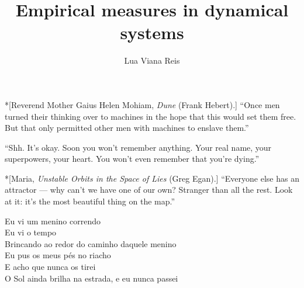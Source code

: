 \documentclass[a4paper,12pt,oneside]{memoir}
\title{Empirical measures in dynamical systems}
\author{Lua Viana Reis}
\begin{document}
\begin{titlingpage}
  \maketitle
\end{titlingpage}

\frontmatter
  
\begin{dedication}*[Reverend Mother Gaius Helen Mohiam, \emph{Dune} (Frank Hebert).]
  \enquote{Once men turned their thinking over to machines in the hope that this would set them free. But that only permitted other men with machines to enslave them.}
\end{dedication}

\vfill

\begin{dedication}[Mr.\ Melancholy.]
  \enquote{Shh. It's okay. Soon you won't remember anything. Your real name, your superpowers, your heart. You won't even remember that you're dying.}
\end{dedication}

\pagebreak

\begin{dedication}*[Maria, \emph{Unstable Orbits in the Space of Lies} (Greg Egan).]
  \enquote{Everyone else has an attractor --- why can't we have one of our own? Stranger than all the rest. Look at it: it's the most beautiful thing on the map.}
\end{dedication}

\vfill

\begin{dedication}
  Eu vi um menino correndo\\
  Eu vi o tempo\\
  Brincando ao redor do caminho daquele menino\\
  Eu pus os meus pés no riacho\\
  E acho que nunca os tirei\\
  O Sol ainda brilha na estrada, e eu nunca passei
\end{dedication}

\end{document}
